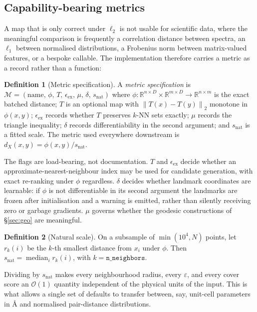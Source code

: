 \documentclass[12pt]{iopart}
\theoremstyle{definition}
\newtheorem{definition}{Definition}
\theoremstyle{plain}
\theoremstyle{remark}
\newcommand{\R}{\mathbb{R}}
\newcommand{\norm}[1]{\left\lVert#1\right\rVert}
\DeclareMathOperator{\med}{median}
\newcommand{\code}[1]{\texttt{#1}}
\begin{document}
\subsection{Capability-bearing metrics}

A map that is only correct under $\ell_2$ is not usable for scientific data,
where the meaningful comparison is frequently a correlation distance between
spectra, an $\ell_1$ between normalised distributions, a Frobenius norm between
matrix-valued features, or a bespoke callable. The implementation therefore
carries a metric as a record rather than a function:

\begin{definition}[Metric specification]
\label{def:metricspec}
A \emph{metric specification} is
$\mathcal{M}=(\mathrm{name},\,\phi,\,T,\,\epsilon_{\mathrm{ex}},\,
\mu,\,\delta,\,s_{\mathrm{nat}})$ where $\phi:\R^{n\times D}\times\R^{m\times
D}\to\R^{n\times m}$ is the exact batched distance; $T$ is an optional map with
$\norm{T(x)-T(y)}_2$ monotone in $\phi(x,y)$; $\epsilon_{\mathrm{ex}}$ records
whether $T$ preserves $k$-NN sets exactly; $\mu$ records the triangle
inequality; $\delta$ records differentiability in the second argument; and
$s_{\mathrm{nat}}$ is a fitted scale. The metric used everywhere downstream is
$d_X(x,y)=\phi(x,y)/s_{\mathrm{nat}}$.
\end{definition}

The flags are load-bearing, not documentation. $T$ and $\epsilon_{\mathrm{ex}}$
decide whether an approximate-nearest-neighbour index may be used for candidate
generation, with exact re-ranking under $\phi$ regardless. $\delta$ decides
whether landmark coordinates are learnable: if $\phi$ is not differentiable in
its second argument the landmarks are frozen after initialisation and a warning
is emitted, rather than silently receiving zero or garbage gradients. $\mu$
governs whether the geodesic constructions of \S\ref{sec:geo} are meaningful.

\begin{definition}[Natural scale]
\label{def:natscale}
On a subsample of $\min(10^4,N)$ points, let $r_k(i)$ be the $k$-th smallest
distance from $x_i$ under $\phi$. Then
$s_{\mathrm{nat}}=\med_i r_k(i)$, with $k=\code{n\_neighbors}$.
\end{definition}

Dividing by $s_{\mathrm{nat}}$ makes every neighbourhood radius, every
$\varepsilon$, and every cover score an $\mathcal{O}(1)$ quantity independent
of the physical units of the input. This is what allows a single set of
defaults to transfer between, say, unit-cell parameters in \AA{} and normalised
pair-distance distributions.
\end{document}
